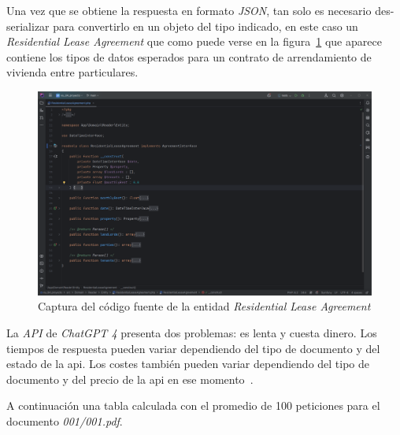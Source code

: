 Una vez que se obtiene la respuesta en formato \textit{JSON}, tan solo es necesario des-serializar para convertirlo
en un objeto del tipo indicado, en este caso un \textit{Residential Lease Agreement} que como puede verse en la
figura~\ref{fig:chapter_4.4.residential_agreement} que aparece contiene los tipos de datos esperados para un contrato de
arrendamiento de vivienda entre particulares.

\begin{figure}[ht]
    \begin{center}
        \includegraphics[width=\textwidth]{./chapter/4/images/chapter_4.4.residential_lease_agreement}
        \caption{Captura del código fuente de la entidad \textit{Residential Lease Agreement}}
        \label{fig:chapter_4.4.residential_agreement}
    \end{center}
\end{figure}

La \textit{API} de \textit{ChatGPT 4} presenta dos problemas: es lenta y cuesta dinero.
Los tiempos de respuesta pueden variar dependiendo del tipo de documento y del estado de la api.
Los costes también pueden variar dependiendo del tipo de documento y del precio de la api en ese
momento~\cite{url_openai_api_pricing}.

A continuación una tabla calculada con el promedio de 100 peticiones para el documento \textit{001/001.pdf}.

